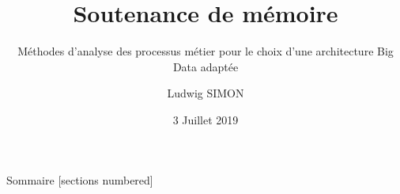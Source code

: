 \documentclass[10pt]{beamer}
\title{Soutenance de mémoire}
\subtitle{Méthodes d'analyse des processus métier pour le choix d'une architecture Big Data adaptée}
\date{3 Juillet 2019}
\author{Ludwig SIMON}
\institute{Université Paris Nanterre\\Tuteur : Mcf. Emmanuel HYON}
\begin{document}
\maketitle

\begin{frame}{Sommaire}
  [sections numbered]
  \tableofcontents[hideallsubsections]
\end{frame}










\end{document}
